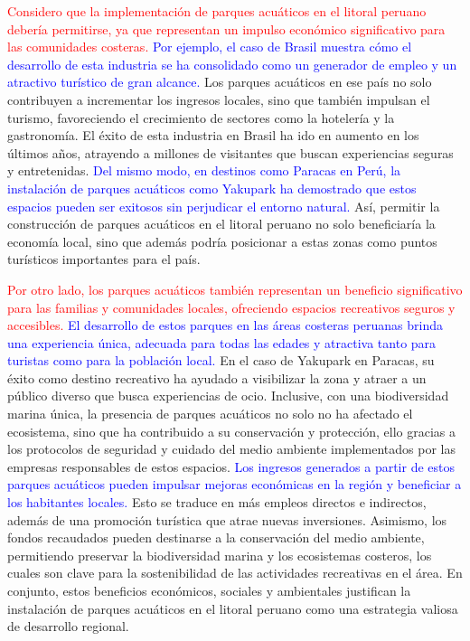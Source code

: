 \documentclass{article}
\begin{document}
\textcolor{red}{Considero que la implementación de parques acuáticos en el litoral peruano debería permitirse, ya que representan un impulso económico significativo para las comunidades costeras.} \textcolor{blue}{Por ejemplo, el caso de Brasil muestra cómo el desarrollo de esta industria se ha consolidado como un generador de empleo y un atractivo turístico de gran alcance.} Los parques acuáticos en ese país no solo contribuyen a incrementar los ingresos locales, sino que también impulsan el turismo, favoreciendo el crecimiento de sectores como la hotelería y la gastronomía. El éxito de esta industria en Brasil ha ido en aumento en los últimos años, atrayendo a millones de visitantes que buscan experiencias seguras y entretenidas. \textcolor{blue}{Del mismo modo, en destinos como Paracas en Perú, la instalación de parques acuáticos como Yakupark ha demostrado que estos espacios pueden ser exitosos sin perjudicar el entorno natural.} Así, permitir la construcción de parques acuáticos en el litoral peruano no solo beneficiaría la economía local, sino que además podría posicionar a estas zonas como puntos turísticos importantes para el país.



\textcolor{red}{Por otro lado, los parques acuáticos también representan un beneficio significativo para las familias y comunidades locales, ofreciendo espacios recreativos seguros y accesibles.} \textcolor{blue}{El desarrollo de estos parques en las áreas costeras peruanas brinda una experiencia única, adecuada para todas las edades y atractiva tanto para turistas como para la población local.} En el caso de Yakupark en Paracas, su éxito como destino recreativo ha ayudado a visibilizar la zona y atraer a un público diverso que busca experiencias de ocio. Inclusive, con una biodiversidad marina única, la presencia de parques acuáticos no solo no ha afectado el ecosistema, sino que ha contribuido a su conservación y protección, ello gracias a los protocolos de seguridad y cuidado del medio ambiente implementados por las empresas responsables de estos espacios. \textcolor{blue}{Los ingresos generados a partir de estos parques acuáticos pueden impulsar mejoras económicas en la región y beneficiar a los habitantes locales.} Esto se traduce en más empleos directos e indirectos, además de una promoción turística que atrae nuevas inversiones. Asimismo, los fondos recaudados pueden destinarse a la conservación del medio ambiente, permitiendo preservar la biodiversidad marina y los ecosistemas costeros, los cuales son clave para la sostenibilidad de las actividades recreativas en el área. En conjunto, estos beneficios económicos, sociales y ambientales justifican la instalación de parques acuáticos en el litoral peruano como una estrategia valiosa de desarrollo regional.
\end{document}
